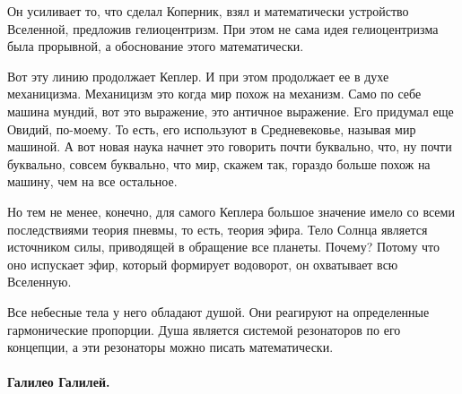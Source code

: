Он
усиливает то, что сделал Коперник, взял и математически устройство Вселенной, предложив гелиоцентризм. 
При этом не сама идея гелиоцентризма была прорывной, а обоснование этого математически. 




Вот эту линию продолжает Кеплер. И при этом продолжает ее в
духе механицизма. Механицизм это когда мир
похож на механизм.  Само по
себе машина мундий, вот это выражение, это античное выражение. Его придумал еще
Овидий, по-моему. То есть, его используют в Средневековье, называя мир машиной.
А вот новая наука начнет это говорить почти
буквально, что, ну почти буквально, совсем буквально, что мир, скажем так,
гораздо больше похож на машину, чем на все остальное. 

Но тем не менее, конечно,
для самого Кеплера большое значение имело со всеми последствиями теория пневмы,
то есть, теория эфира. Тело Солнца является источником силы, приводящей в
обращение все планеты. Почему? Потому что оно испускает эфир, который формирует водоворот, он охватывает всю Вселенную. 

Все небесные тела у него обладают душой. Они реагируют на определенные гармонические пропорции. Душа является системой резонаторов по
его концепции, а эти резонаторы можно писать
математически. 

\paragraph{Галилео Галилей.}


